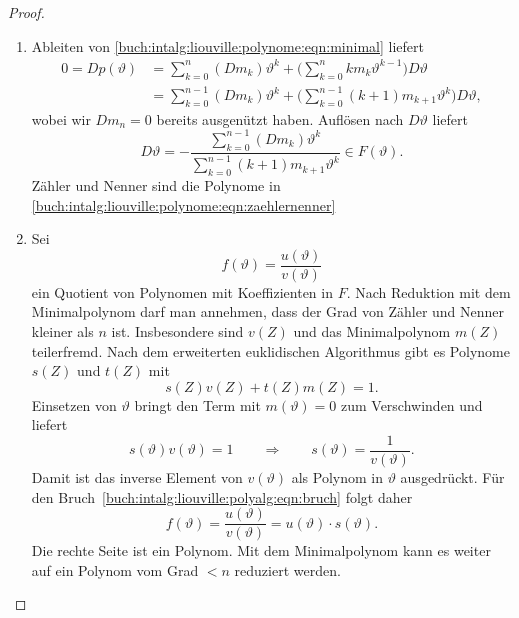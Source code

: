 \begin{proof}
\begin{enumerate}
\item
Ableiten von
\eqref{buch:intalg:liouville:polynome:eqn:minimal}
liefert
\begin{align*}
0
=
Dp(\vartheta)
&=
\sum_{k=0}^n (Dm_k)\vartheta^k
+
\biggl(\sum_{k=0}^n km_k\vartheta^{k-1} \biggl)D\vartheta
\\
&=
\sum_{k=0}^{n-1} (Dm_k)\vartheta^k
+
\biggl(\sum_{k=0}^{n-1} (k+1)m_{k+1}\vartheta^k \biggl)D\vartheta
,
\end{align*}
wobei wir $Dm_n=0$ bereits ausgenützt haben.
Auflösen nach $D\vartheta$ liefert
\[
D\vartheta
=
-\frac{
\displaystyle
\sum_{k=0}^{n-1} (Dm_k) \vartheta^k
}{
\displaystyle
\sum_{k=0}^{n-1} (k+1)m_{k+1} \vartheta^k
}
\in
F(\vartheta).
\]
Zähler und Nenner sind die Polynome in
\eqref{buch:intalg:liouville:polynome:eqn:zaehlernenner}
\item
Sei 
\begin{equation}
f(\vartheta)
=
\frac{u(\vartheta)}{v(\vartheta)}
\label{buch:intalg:liouville:polyalg:eqn:bruch}
\end{equation}
ein Quotient von Polynomen mit Koeffizienten in $F$.
Nach Reduktion mit dem Minimalpolynom darf man annehmen, dass
der Grad von Zähler und Nenner kleiner als $n$ ist.
Insbesondere sind $v(Z)$ und das Minimalpolynom $m(Z)$
teilerfremd.
Nach dem erweiterten euklidischen Algorithmus gibt es
Polynome $s(Z)$ und $t(Z)$ mit 
\[
s(Z)v(Z) + t(Z)m(Z) = 1.
\]
Einsetzen von $\vartheta$ bringt den Term mit $m(\vartheta)=0$ zum
Verschwinden und liefert
\[
s(\vartheta)v(\vartheta) = 1
\qquad\Rightarrow\qquad s(\vartheta) = \frac{1}{v(\vartheta)}.
\]
Damit ist das inverse Element von $v(\vartheta)$ als Polynom in
$\vartheta$ ausgedrückt.
Für den Bruch~\eqref{buch:intalg:liouville:polyalg:eqn:bruch}
folgt daher
\[
f(\vartheta)
=
\frac{u(\vartheta)}{v(\vartheta)}
=
u(\vartheta)\cdot s(\vartheta).
\]
Die rechte Seite ist ein Polynom.
Mit dem Minimalpolynom kann es weiter auf ein Polynom vom 
Grad $<n$ reduziert werden.
\qedhere
\end{enumerate}
\end{proof}
